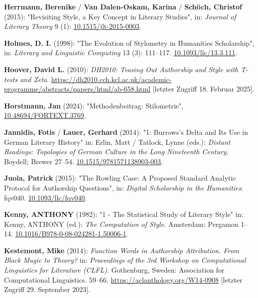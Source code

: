 \documentclass[
  12pt,
  letterpaper,
  DIV=11,
  numbers=noendperiod]{scrreprt}
\newlength{\cslhangindent}
\newenvironment{CSLReferences}[2] %
 {\begin{list}{}{%
  \setlength{\itemindent}{0pt}
  \setlength{\leftmargin}{0pt}
  \setlength{\parsep}{0pt}
  \ifodd #1
   \setlength{\leftmargin}{\cslhangindent}
   \setlength{\itemindent}{-1\cslhangindent}
  \fi
  \setlength{\itemsep}{#2\baselineskip}}}
 {\end{list}}
\begin{document}
\begin{CSLReferences}{1}{0}
\textbf{Herrmann, Berenike} / \textbf{Van Dalen-Oskam, Karina} /
\textbf{Schöch, Christof} (2015): "Revisiting {Style}, a {Key} {Concept}
in {Literary} {Studies}", in: \emph{Journal of Literary Theory} 9 (1):
\href{https://doi.org/10.1515/jlt-2015-0003}{10.1515/jlt-2015-0003}.

\textbf{Holmes, D. I.} (1998): "The {Evolution} of {Stylometry} in
{Humanities} {Scholarship}", in: \emph{Literary and Linguistic
Computing} 13 (3): 111--117.
\href{https://doi.org/10.1093/llc/13.3.111}{10.1093/llc/13.3.111}.

\textbf{Hoover, David L.} (2010): \emph{{DH2010}: {Teasing} {Out}
{Authorship} and {Style} with {T}-tests and {Zeta}}.
\url{https://dh2010.cch.kcl.ac.uk/academic-programme/abstracts/papers/html/ab-658.html}
{[}letzter Zugriff 18. Februar 2025{]}.

\textbf{Horstmann, Jan} (2024): "Methodenbeitrag: {Stilometrie}",
\href{https://doi.org/10.48694/FORTEXT.3769}{10.48694/FORTEXT.3769}.

\textbf{Jannidis, Fotis} / \textbf{Lauer, Gerhard} (2014): "1:
{Burrows}'s {Delta} and {Its} {Use} in {German} {Literary} {History}"
in: Erlin, Matt / Tatlock, Lynne (eds.): \emph{Distant {Readings}:
{Topologies} of {German} {Culture} in the {Long} {Nineteenth}
{Century}}. Boydell; Brewer 27--54.
\href{https://doi.org/10.1515/9781571138903-003}{10.1515/9781571138903-003}.

\textbf{Juola, Patrick} (2015): "The {Rowling} {Case}: {A} {Proposed}
{Standard} {Analytic} {Protocol} for {Authorship} {Questions}", in:
\emph{Digital Scholarship in the Humanities}: fqv040.
\href{https://doi.org/10.1093/llc/fqv040}{10.1093/llc/fqv040}.

\textbf{Kenny, ANTHONY} (1982): "1 - {The} {Statistical} {Study} of
{Literary} {Style}" in: Kenny, ANTHONY (ed.): \emph{The {Computation} of
{Style}}. Amsterdam: Pergamon 1--14.
\href{https://doi.org/10.1016/B978-0-08-024281-1.50006-1}{10.1016/B978-0-08-024281-1.50006-1}.

\textbf{Kestemont, Mike} (2014): \emph{Function {Words} in {Authorship}
{Attribution}. {From} {Black} {Magic} to {Theory}?} in:
\emph{Proceedings of the 3rd {Workshop} on {Computational} {Linguistics}
for {Literature} ({CLFL})}. Gothenburg, Sweden: Association for
Computational Linguistics. 59--66.
\url{https://aclanthology.org/W14-0908} {[}letzter Zugriff 29. September
2023{]}.


\end{CSLReferences}
\end{document}
